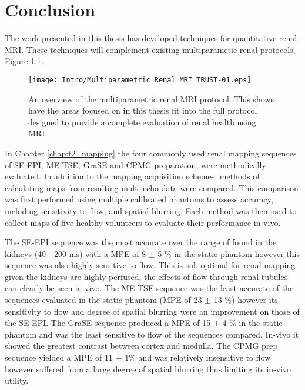 \chapter{Conclusion}
\label{chap:conclusion}
\newpage
The work presented in this thesis has developed techniques for quantitative renal \ac{MRI}. These techniques will complement existing multiparametic renal protocols, Figure \ref{fig:conc_multi_para_overview}.

\begin{figure}[H]
	\centering
	\texttt{[image: Intro/Multiparametric\_Renal\_MRI\_TRUST-01.eps]}
	\caption{An overview of the multiparametric renal \ac{MRI} protocol. This shows have the areas focused on in this thesis fit into the full protocol designed to provide a complete evaluation of renal health using \ac{MRI}.}
	\label{fig:conc_multi_para_overview}	
\end{figure}

In Chapter \ref{chap:t2_mapping} the four commonly used renal \ttwo mapping sequences of \ac{SE}-\ac{EPI}, \ac{ME-TSE}, \ac{GraSE} and \ac{CPMG} \ttwo preparation, were methodically evaluated. In addition to the \ttwo mapping acquisition schemes, methods of calculating \ttwo maps from resulting multi-echo data were compared. This comparison was first performed using multiple calibrated phantoms to assess accuracy, including sensitivity to flow, and spatial blurring. Each method was then used to collect \ttwo maps of five healthy volunteers to evaluate their performance in-vivo. 

The \ac{SE}-\ac{EPI} sequence was the most accurate over the range of \ttwo found in the kidneys (40 - 200 ms) with a \ac{MPE} of 8 $\pm$ 5 \% in the static phantom however this sequence was also highly sensitive to flow. This is sub-optimal for renal \ttwo mapping given the kidneys are highly perfused, the effects of flow through renal tubules can clearly be seen in-vivo. The \ac{ME-TSE} sequence was the least accurate of the sequences evaluated in the static phantom (\ac{MPE} of 23 $\pm$ 13 \%) however its sensitivity to flow and degree of spatial blurring were an improvement on those of the \ac{SE}-\ac{EPI}. The \ac{GraSE} sequence produced a \ac{MPE} of 15 $\pm$ 4 \% in the static phantom and was the least sensitive to flow of the sequences compared. In-vivo it showed the greatest contrast between cortex and medulla. The \ac{CPMG} \ttwo prep sequence yielded a \ac{MPE} of 11 $\pm$ 1\% and was relatively insensitive to flow however suffered from a large degree of spatial blurring thus limiting its in-vivo utility. 

